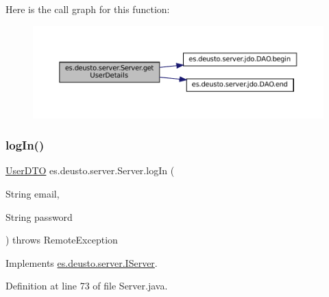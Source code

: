Here is the call graph for this function\+:
\nopagebreak
\begin{figure}[H]
\begin{center}
\leavevmode
\includegraphics[width=350pt]{classes_1_1deusto_1_1server_1_1_server_ad742fe9a45edccd8b2309be98a74baae_cgraph}
\end{center}
\end{figure}
\mbox{\label{classes_1_1deusto_1_1server_1_1_server_ab93f5cc9b5825192c31cd2088014378d}} 
\subsubsection{\texorpdfstring{logIn()}{logIn()}}
{\footnotesize\ttfamily \mbox{\hyperlink{classes_1_1deusto_1_1server_1_1data_1_1_user_d_t_o}{User\+D\+TO}} es.\+deusto.\+server.\+Server.\+log\+In (\begin{DoxyParamCaption}\item[{String}]{email,  }\item[{String}]{password }\end{DoxyParamCaption}) throws Remote\+Exception}



Implements \mbox{\hyperlink{interfacees_1_1deusto_1_1server_1_1_i_server_a62db155ac744b9712e303ceea76a3560}{es.\+deusto.\+server.\+I\+Server}}.



Definition at line 73 of file Server.\+java.

